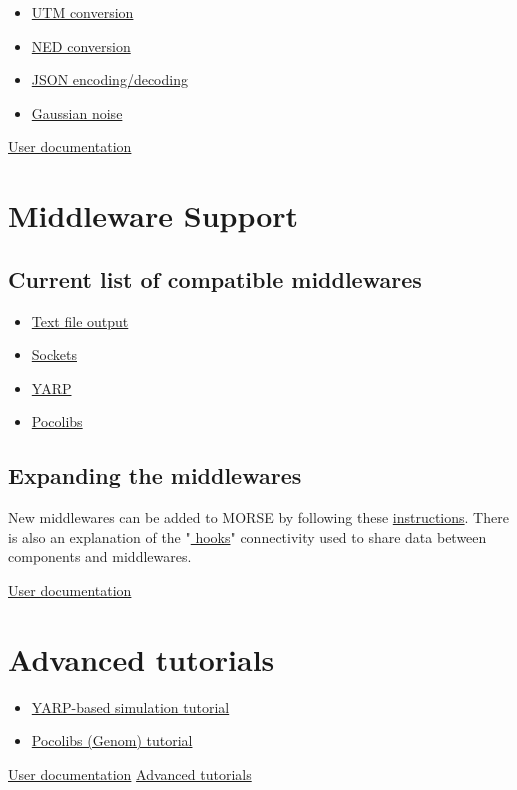 \documentclass[twoside,a4paper,10pt]{report}
\newcommand{\dokutitlelevelone}[1]{\chapter{#1}}
\newcommand{\dokutitleleveltwo}[1]{\section{#1}}
\newcommand{\dokuitem}{\item}
\newcommand{\dokuquoting}{\textbar}
\begin{document}
\begin{itemize}
\dokuitem  \hyperref[b32d6491ce03dd4e6c877f3bfd9ff07e]{ UTM conversion}
\dokuitem  \hyperref[f68daad189b2fffd0b8cab5e36ec9d96]{ NED conversion}
\dokuitem  \hyperref[466deec76ecdf5fca6d38571f6324d54]{ JSON encoding/decoding}
\dokuitem  \hyperref[304e2a3b544f6b9f267a151e1bcee487]{ Gaussian noise}
\end{itemize}
{\dokuquoting}{\dokuquoting} \hyperref[a80da1282f2c775bbc5f2c92c836968b]{ User documentation}


\dokutitlelevelone{Middleware Support}
\label{4303941a1597ae94654bd96854480742}%
\label{9a05db9c4b60b0527010fd997682f523}%

\dokutitleleveltwo{Current list of compatible middlewares}
\label{92515de7e8c9f43d6ca122cbbfd1809e}%

\begin{itemize}
\dokuitem  \hyperref[1cb251ec0d568de6a929b520c4aed8d1]{ Text file output}
\dokuitem  \hyperref[61f2529360aec54f5dc9804b842cf3fa]{ Sockets}
\dokuitem  \hyperref[ec46d0b85077d7a7fe8da2e2b4c70462]{ YARP}
\dokuitem  \hyperref[15f13a3fccdd1ef095539316b61c03c8]{ Pocolibs}
\end{itemize}

\dokutitleleveltwo{Expanding the middlewares}
\label{b3a6313d335453f4c7ad970485acc1a1}%

New middlewares can be added to MORSE by following these \hyperref[6a8f80abb2f3d2288ad863e67f2499a4]{ instructions}. There is also an explanation of the "\hyperref[4e819c837d54a6ed09abc77a8560a66f]{ hooks}" connectivity used to share data between components and middlewares.

{\dokuquoting}{\dokuquoting} \hyperref[a80da1282f2c775bbc5f2c92c836968b]{ User documentation}


\dokutitlelevelone{Advanced tutorials}
\label{1db3103f04a8f50e1168ef3c23748f71}%
\label{1db3103f04a8f50e1168ef3c23748f71}%

\begin{itemize}
\dokuitem  \hyperref[1dd029a60f7f3dd1deaf993ce4538edf]{ YARP-based simulation tutorial}
\dokuitem  \hyperref[5c7d3aeca93d2be4626b023df992dc1d]{ Pocolibs (Genom) tutorial}
\end{itemize}
{\dokuquoting}{\dokuquoting} \hyperref[a80da1282f2c775bbc5f2c92c836968b]{ User documentation}  \hyperref[1db3103f04a8f50e1168ef3c23748f71]{ Advanced tutorials}
\end{document}
